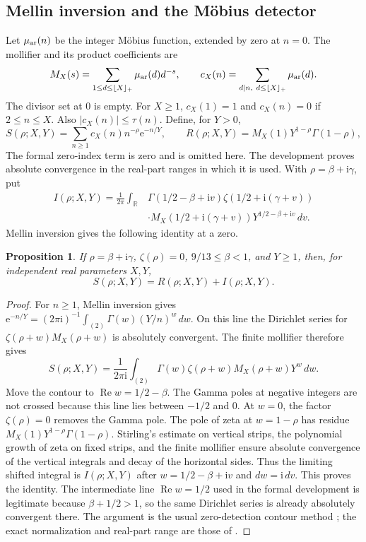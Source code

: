 \documentclass[11pt,a4paper,oneside]{article}
\newtheorem{proposition}[theorem]{Proposition}
\theoremstyle{definition}
\newcommand{\R}{\mathbb R}
\newcommand{\ii}{\mathrm i}
\newcommand{\e}{\mathrm e}
\newcommand{\Rea}{\operatorname{Re}}
\numberwithin{equation}{section}
\begin{document}
\subsection{Mellin inversion and the M\"obius detector}
Let $\mu_{\rm ar}(n)$ be the integer M\"obius function, extended by zero at
$n=0$. The mollifier and its product coefficients are
\[
 M_X(s)=\sum_{1\le d\le\lfloor X\rfloor_+}\mu_{\rm ar}(d)d^{-s},\qquad
 c_X(n)=\sum_{d\mid n,\ d\le\lfloor X\rfloor_+}\mu_{\rm ar}(d).
\]
The divisor set at $0$ is empty. For $X\ge1$, $c_X(1)=1$ and
$c_X(n)=0$ if $2\le n\le X$. Also $|c_X(n)|\le \tau(n)$.
Define, for $Y>0$,
\[
 S(\rho;X,Y)=\sum_{n\ge1}c_X(n)n^{-\rho}\e^{-n/Y},\qquad
 R(\rho;X,Y)=M_X(1)Y^{1-\rho}\Gamma(1-\rho),
\]
The formal zero-index term is zero and is omitted here. The development proves absolute convergence
in the real-part ranges in which it is used. With $\rho=\beta+\ii\gamma$,
put
\begin{align*}
 I(\rho;X,Y)=\frac1{2\pi}\int_\R&
 \Gamma(1/2-\beta+\ii v)\zeta(1/2+\ii(\gamma+v))\\
 &\cdot M_X(1/2+\ii(\gamma+v))Y^{1/2-\beta+\ii v}\,dv.
\end{align*}
Mellin inversion gives the following identity at a zero.
\begin{proposition}\label{input:contour}
If $\rho=\beta+\ii\gamma$, $\zeta(\rho)=0$, $9/13\le\beta<1$, and $Y\ge1$, then, for independent
real parameters $X,Y$,
\[
 S(\rho;X,Y)=R(\rho;X,Y)+I(\rho;X,Y).
\]
\end{proposition}
\begin{proof}
For $n\ge1$, Mellin inversion gives $\e^{-n/Y}=(2\pi\ii)^{-1}\int_{(2)}\Gamma(w)(Y/n)^w\,dw$. On this line the Dirichlet series for $\zeta(\rho+w)M_X(\rho+w)$ is absolutely convergent. The finite mollifier therefore gives
\[
 S(\rho;X,Y)=\frac1{2\pi\ii}\int_{(2)}
 \Gamma(w)\zeta(\rho+w)M_X(\rho+w)Y^w\,dw.
\]
Move the contour to $\Rea w=1/2-\beta$. The Gamma poles at negative integers are not crossed because this line lies between $-1/2$ and $0$. At $w=0$, the factor $\zeta(\rho)=0$ removes the Gamma pole. The pole of zeta at $w=1-\rho$ has residue $M_X(1)Y^{1-\rho}\Gamma(1-\rho)$. Stirling's estimate on vertical strips, the polynomial growth of zeta on fixed strips, and the finite mollifier ensure absolute convergence of the vertical integrals and decay of the horizontal sides. Thus the limiting shifted integral is $I(\rho;X,Y)$ after $w=1/2-\beta+\ii v$ and $dw=\ii\,dv$. This proves the identity. The intermediate line $\Rea w=1/2$ used in the formal development is legitimate because $\beta+1/2>1$, so the same Dirichlet series is already absolutely convergent there. The argument is the usual zero-detection contour method \cite[Section~9]{Kerr}; the exact normalization and real-part range are those of \cite{Lewko}.
\end{proof}
\end{document}
